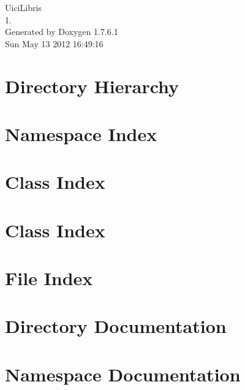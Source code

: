 \documentclass[a4paper]{book}
\begin{document}
\hypersetup{pageanchor=false,citecolor=blue}
\begin{titlepage}
\vspace*{7cm}
\begin{center}
{\Large \-Uici\-Libris \\[1ex]\large 1. }\\
\vspace*{1cm}
{\large \-Generated by Doxygen 1.7.6.1}\\
\vspace*{0.5cm}
{\small Sun May 13 2012 16:49:16}\\
\end{center}
\end{titlepage}
\clearemptydoublepage
{}
\tableofcontents
\clearemptydoublepage
{}
\hypersetup{pageanchor=true,citecolor=blue}
\chapter{\-Directory \-Hierarchy}

\chapter{\-Namespace \-Index}

\chapter{\-Class \-Index}

\chapter{\-Class \-Index}

\chapter{\-File \-Index}

\chapter{\-Directory \-Documentation}



\chapter{\-Namespace \-Documentation}



























\end{document}
